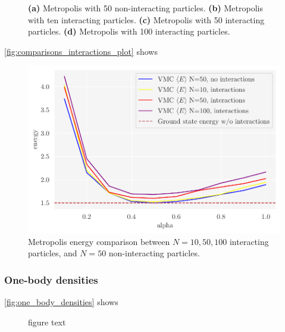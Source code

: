 \begin{figure}[!htb]
\qquad
{}
\caption{\textbf{(a)} Metropolis with 50 non-interacting particles. \textbf{(b)} Metropolis with ten interacting particles. \textbf{(c)} Metropolis with 50 interacting particles. \textbf{(d)} Metropolis with 100 interacting particles.}
\label{fig:interactions_plot}
\end{figure}

\autoref{fig:comparisons_interactions_plot} shows

\begin{figure}[H]
\begin{center}\includegraphics[scale=0.5]{latex/figures/grid_search_analytical_w_interactions_all_N.pdf}
\end{center}
\caption{Metropolis energy comparison between $N=10, 50, 100$ interacting particles, and $N=50$ non-interacting particles.}
\label{fig:comparisons_interactions_plot}
\end{figure}

\subsubsection{One-body densities}
\autoref{fig:one_body_densities} shows
\begin{figure}[H]
\centering
\subfloat[]{{\texttt{[image: ob]}}}
\qquad
{}
\caption{figure text}
\label{fig:fig1}
\end{figure}
